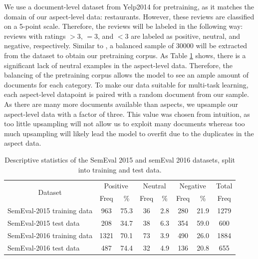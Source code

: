 We use a document-level dataset from Yelp2014 \cite{Tang2016} for pretraining, as it matches the domain of our aspect-level data: restaurants. However, these reviews are classified on a 5-point scale. Therefore, the reviews will be labeled in the following way: reviews with ratings $>3$, $=3$, and $<3$ are labeled as positive, neutral, and negative, respectively. Similar to \cite{He2018}, a balanced sample of 30000 will be extracted from the dataset to obtain our pretraining corpus. As Table \ref{describeData} shows, there is a significant lack of neutral examples in the aspect-level data. Therefore, the balancing of the pretraining corpus allows the model to see an ample amount of documents for each category. To make our data suitable for multi-task learning, each aspect-level datapoint is paired with a random document from our sample. As there are many more documents available than aspects, we upsample our aspect-level data with a factor of three. This value was chosen from intuition, as too little upsampling will not allow us to exploit many documents whereas too much upsampling will likely lead the model to overfit due to the duplicates in the aspect data.

\begin{table}[h]
\caption{Descriptive statistics of the SemEval 2015 and semEval 2016 datasets, split into training and test data.}
\label{describeData}
\setlength{\tabcolsep}{8.2pt}
\begin{tabular}{@{}lccccccc@{}}
\toprule
\multicolumn{1}{c}{\multirow{2}{*}{Dataset}} & \multicolumn{2}{c}{Positive} & \multicolumn{2}{c}{Neutral} & \multicolumn{2}{c}{Negative} & Total \\ \cmidrule(l){2-8} 
\multicolumn{1}{c}{}                         & Freq          & \%           & Freq          & \%          & Freq          & \%           & Freq  \\ \midrule
SemEval-2015 training data                   & 963           & 75.3         & 36            & 2.8         & 280           & 21.9         & 1279  \\
SemEval-2015 test data                       & 208           & 34.7         & 38            & 6.3         & 354           & 59.0         & 600   \\
SemEval-2016 training data                   & 1321          & 70.1         & 73            & 3.9         & 490           & 26.0         & 1884  \\
SemEval-2016 test data                       & 487           & 74.4         & 32            & 4.9         & 136           & 20.8         & 655   \\ \bottomrule
\end{tabular}
\vspace{-5mm}
\end{table}

